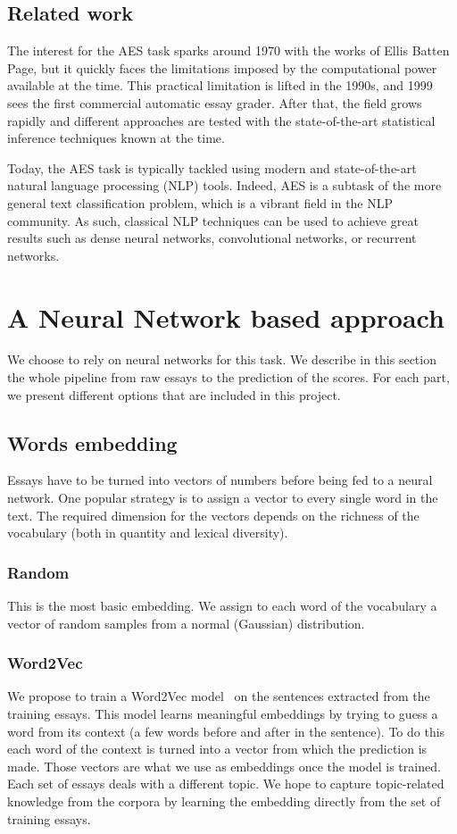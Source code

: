 \documentclass[a4paper,12pt,english]{article}
\begin{document}
\subsection{Related work}
The interest for the AES task sparks around 1970 with the works of Ellis Batten Page\cite{page1966imminence}, but it quickly faces the limitations imposed by the computational power available at the time. This practical limitation is lifted in the 1990s, and 1999 sees the first commercial automatic essay grader\cite{attali2004automated}. After that, the field grows rapidly and different approaches are tested with the state-of-the-art statistical inference techniques known at the time\cite{rudner2002automated}.\par
Today, the AES task is typically tackled using modern and state-of-the-art natural language processing (NLP) tools. Indeed, AES is a subtask of the more general text classification problem, which is a vibrant field in the NLP community. As such, classical NLP techniques can be used to achieve great results such as dense neural networks\cite{murray2012automatic}, convolutional networks\cite{kim2014convolutional}, or recurrent networks\cite{taghipour2016neural}.

\section{A Neural Network based approach}

We choose to rely on neural networks for this task.
We describe in this section the whole pipeline from raw essays to the prediction of the scores.
For each part, we present different options that are included in this project.

\subsection{Words embedding}
Essays have to be turned into vectors of numbers before being fed to a neural network.
One popular strategy is to assign a vector to every single word in the text.
The required dimension for the vectors depends on the richness of the vocabulary (both in quantity and lexical diversity).
\subsubsection{Random}
This is the most basic embedding.
We assign to each word of the vocabulary a vector of random samples from a normal (Gaussian) distribution.
\subsubsection{Word2Vec}
We propose to train a Word2Vec model~\cite{mikolov2013efficient} on the sentences extracted from the training essays.
This model learns meaningful embeddings by trying to guess a word from its context (a few words before and after in the sentence).
To do this each word of the context is turned into a vector from which the prediction is made.
Those vectors are what we use as embeddings once the model is trained.
Each set of essays deals with a different topic.
We hope to capture topic-related knowledge from the corpora by learning the embedding directly from the set of training essays.
\end{document}
